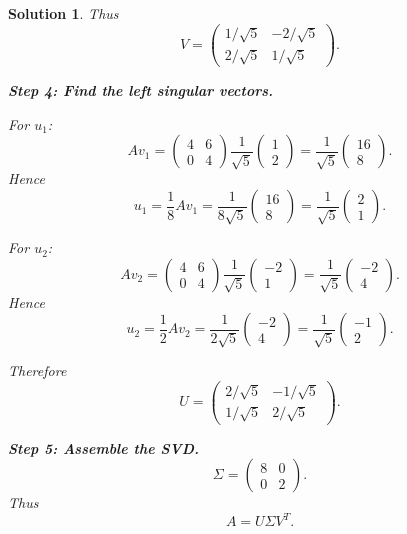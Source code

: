 \documentclass[11pt,a4paper]{article}
\theoremstyle{sol}
\newtheorem*{solution}{Solution}
\begin{document}
\begin{solution}
Thus
\[
V=
\begin{pmatrix}
1/\sqrt5&-2/\sqrt5\\
2/\sqrt5&1/\sqrt5
\end{pmatrix}.
\]

\textbf{Step 4: Find the left singular vectors.}

For $u_1$:
\[
Av_1=
\begin{pmatrix}4&6\\0&4\end{pmatrix}
\frac{1}{\sqrt5}\begin{pmatrix}1\\2\end{pmatrix}
=\frac{1}{\sqrt5}\begin{pmatrix}16\\8\end{pmatrix}.
\]
Hence
\[
u_1=\frac{1}{8}Av_1
=\frac{1}{8\sqrt5}\begin{pmatrix}16\\8\end{pmatrix}
=\frac{1}{\sqrt5}\begin{pmatrix}2\\1\end{pmatrix}.
\]

For $u_2$:
\[
Av_2=
\begin{pmatrix}4&6\\0&4\end{pmatrix}
\frac{1}{\sqrt5}\begin{pmatrix}-2\\1\end{pmatrix}
=\frac{1}{\sqrt5}\begin{pmatrix}-2\\4\end{pmatrix}.
\]
Hence
\[
u_2=\frac{1}{2}Av_2
=\frac{1}{2\sqrt5}\begin{pmatrix}-2\\4\end{pmatrix}
=\frac{1}{\sqrt5}\begin{pmatrix}-1\\2\end{pmatrix}.
\]

Therefore
\[
U=
\begin{pmatrix}
2/\sqrt5&-1/\sqrt5\\
1/\sqrt5&2/\sqrt5
\end{pmatrix}.
\]

\textbf{Step 5: Assemble the SVD.}
\[
\Sigma=
\begin{pmatrix}
8&0\\
0&2
\end{pmatrix}.
\]
Thus
\[
\boxed{
A=U\Sigma V^T.
}
\]
\end{solution}
\end{document}
